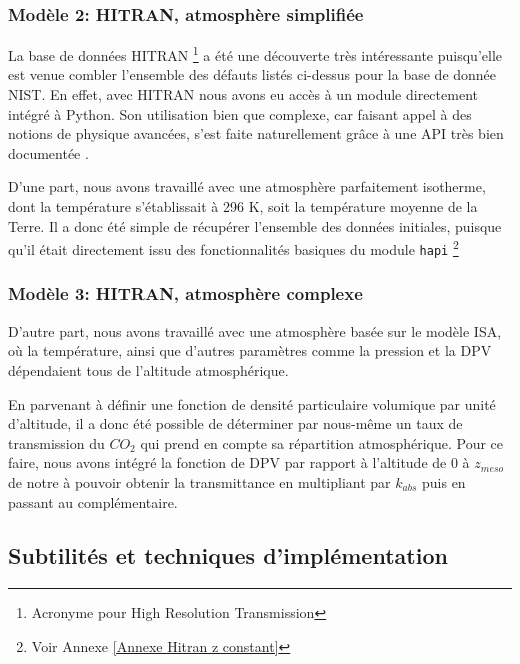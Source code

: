 \documentclass[a4paper, 12pt]{report} %
\newcommand{\annexeref}[1]{Voir Annexe \ref{#1}}
\begin{document}
\subsubsection{Modèle 2: HITRAN, atmosphère simplifiée}

    La base de données HITRAN \footnote{Acronyme pour High
Resolution Transmission} a été une découverte très intéressante puisqu'elle est venue combler l'ensemble des défauts listés ci-dessus pour la base de donnée NIST. En effet, avec HITRAN nous avons eu accès à un module directement intégré à Python. Son utilisation bien que complexe, car faisant appel à des notions de physique avancées, s'est faite naturellement grâce à une API très bien documentée . \vspace{\baselineskip}

    D'une part, nous avons travaillé avec une atmosphère
parfaitement isotherme, dont la température s'établissait à 296 K, soit la température moyenne de la Terre. Il a donc été simple de récupérer l'ensemble des données initiales, puisque qu'il était directement issu des fonctionnalités basiques du module \texttt{hapi} \footnote{\annexeref{Annexe Hitran z constant}}

\subsubsection{Modèle 3: HITRAN, atmosphère complexe}\label{subsubsec:Modèle 3 info}

    D'autre part, nous avons travaillé avec une atmosphère basée
sur le modèle ISA, où la température, ainsi que d'autres paramètres comme la pression et la DPV dépendaient tous de l'altitude atmosphérique. \vspace{\baselineskip}

   En parvenant à définir une fonction de densité particulaire
volumique par unité d'altitude, il a donc été possible de déterminer par nous-même un taux de transmission du $CO_2$ qui prend en compte sa répartition atmosphérique. Pour ce faire, nous avons intégré la fonction de DPV par rapport à l'altitude de 0 à $z_{meso}$ de notre à pouvoir obtenir la transmittance en multipliant par $k_{abs}$ puis en passant au complémentaire.

\subsection{Subtilités et techniques d'implémentation}
\end{document}
